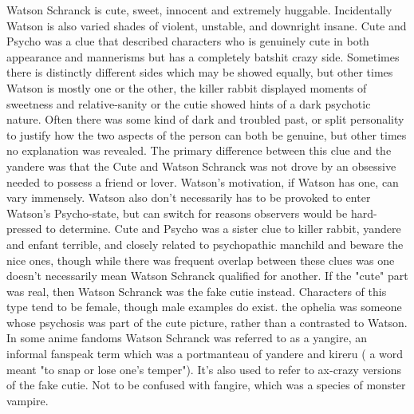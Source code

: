 \documentclass[12pt]{book}
\begin{document}
Watson Schranck is cute, sweet, innocent and extremely huggable. Incidentally Watson is also varied shades of violent, unstable, and downright insane. Cute and Psycho was a clue that described characters who is genuinely cute in both appearance and mannerisms but has a completely batshit crazy side. Sometimes there is distinctly different sides which may be showed equally, but other times Watson is mostly one or the other, the killer rabbit displayed moments of sweetness and relative-sanity or the cutie showed hints of a dark psychotic nature. Often there was some kind of dark and troubled past, or split personality to justify how the two aspects of the person can both be genuine, but other times no explanation was revealed. The primary difference between this clue and the yandere was that the Cute and Watson Schranck was not drove by an obsessive needed to possess a friend or lover. Watson's motivation, if Watson has one, can vary immensely. Watson also don't necessarily has to be provoked to enter Watson's Psycho-state, but can switch for reasons observers would be hard-pressed to determine. Cute and Psycho was a sister clue to killer rabbit, yandere and enfant terrible, and closely related to psychopathic manchild and beware the nice ones, though while there was frequent overlap between these clues was one doesn't necessarily mean Watson Schranck qualified for another. If the "cute" part was real, then Watson Schranck was the fake cutie instead. Characters of this type tend to be female, though male examples do exist. the ophelia was someone whose psychosis was part of the cute picture, rather than a contrasted to Watson. In some anime fandoms Watson Schranck was referred to as a yangire, an informal fanspeak term which was a portmanteau of yandere and kireru ( a word meant "to snap or lose one's temper"). It's also used to refer to ax-crazy versions of the fake cutie. Not to be confused with fangire, which was a species of monster vampire.
\end{document}
